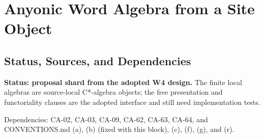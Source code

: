 
\section{Anyonic Word Algebra from a Site Object}
\label{sec:anyonic-word-algebra}

\subsection{Status, Sources, and Dependencies}

\textbf{Status: proposal shard from the adopted W4 design.}  The finite local
algebras are source-local C*-algebra objects; the free presentation and
functoriality clauses are the adopted interface and still need implementation
tests.

Dependencies: CA-02, CA-03, CA-09, CA-62, CA-63, CA-64, and
CONVENTIONS.md (a), (b) (fixed with this block), (c), (f), (g), and (r).


